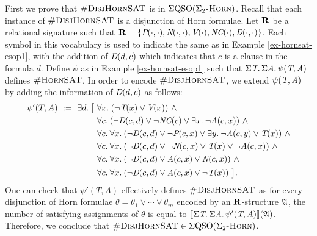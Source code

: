
First we prove that $\textsc{\#DisjHornSAT}$ is in $\Sigma{\rm QSO}(\Sigma_2\textsc{-Horn})$. Recall that each instance of $\textsc{\#DisjHornSAT}$ is a disjunction of Horn formulae. Let $\mathbf{R}$ be a relational signature such that $\mathbf{R} = \{\textit{P}(\cdot,\cdot), \textit{N}(\cdot,\cdot), \textit{V}(\cdot), \textit{NC}(\cdot), \textit{D}(\cdot,\cdot)\}$. Each symbol in this vocabulary is used to indicate the same as in Example \ref{ex-hornsat-esop1}, with the addition of $\textit{D}(d,c)$ which indicates that $c$ is a clause in the formula $d$. Define $\psi$ as in Example \ref{ex-hornsat-esop1} such that $\Sigma{\textit{T}}.\, \Sigma{\textit{A}}.\, \psi(\textit{T},\textit{A})$
defines $\textsc{\#HornSAT}$. In order to encode $\textsc{\#DisjHornSAT}$, we extend $\psi(\textit{T},\textit{A})$ by adding the information of $\textit{D}(d,c)$ as follows:
\begin{align*}
\psi'(T,A) \ := \ \exists{d}.\: \big[ \ & \forall{x}.\: (\neg \textit{T}(x) \vee \textit{V}(x)) \ \wedge\\
& \forall{c}.\: (\neg \textit{D}(c,d)\vee \neg \textit{NC}(c) \vee  \exists{x}.\: \neg \textit{A}(c,x)) \ \wedge\\
& \forall{c}.\: \forall{x}.\: (\neg \textit{D}(c,d)\vee\neg \textit{P}(c,x) \vee \exists{y}.\: \neg \textit{A}(c,y) \vee \textit{T}(x)) \ \wedge\\
& \forall{c}.\: \forall{x}.\: (\neg \textit{D}(c,d)\vee\neg \textit{N}(c,x) \vee \textit{T}(x) \vee \neg \textit{A}(c,x)) \ \wedge\\
& \forall{c}.\: \forall{x}.\:  (\neg \textit{D}(c,d)\vee\textit{A}(c,x) \vee \textit{N}(c,x)) \ \wedge\\
& \forall{c}.\: \forall{x}.\: (\neg \textit{D}(c,d)\vee\textit{A}(c,x) \vee \neg\textit{T}(x)) \ \big].
\end{align*}
One can check that $\psi'(T,A)$ effectively defines $\textsc{\#DisjHornSAT}$ as for every disjunction of Horn formulae $\theta = \theta_1\vee\cdots\vee\theta_m$ encoded by an $\mathbf{R}$-structure $\mathfrak{A}$, the number of satisfying assignments of $\theta$ is equal to ${\llbracket{}{\Sigma{\textit{T}}.\, \Sigma{\textit{A}}.\, \psi'(\textit{T},\textit{A})}\rrbracket}(\mathfrak{A})$.  Therefore, we conclude that $\textsc{\#DisjHornSAT} \in \Sigma{\rm QSO}(\Sigma_2\textsc{-Horn})$.

